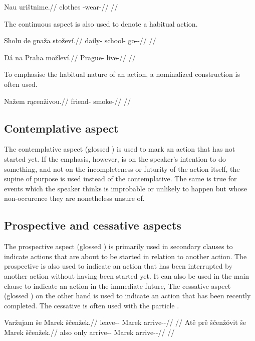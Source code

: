 \pex
\begingl
\gla Nau urištnime.//
\glb clothes \Refl{}-wear-//
\glft {} //
\endgl
\xe

The continuous aspect is also used to denote a habitual action.

\pex
\begingl
\gla Sholu de gnaža stoževí.//
\glb daily-\Ins{}  school-\Acc{} go-\Av{}-\Cont{}//
\glft {} //
\endgl
\xe

\pex
\begingl
\gla Dá na Praha možleví.//
\glb {} \Loc{} Prague-\Acc{} live-//
\glft {} //
\endgl
\xe

To emphasise the habitual nature of an action, a nominalized construction is
often used.

\pex
\begingl
\gla Nažem r\k{a}cenživou.//
\glb friend-\First{}\Sg{} smoke-//
\glft {} //
\endgl
\xe


\subsection{Contemplative aspect}

The contemplative aspect (glossed \Ctp{}) is used to mark an action that has not
started yet. If the emphasis, however, is on the speaker's intention to do
something, and not on the incompleteness or futurity of the action itself, the
supine of purpose is used instead of the contemplative. The same is true for
events which the speaker thinks is improbable or unlikely to happen but whose
non-occurence they are nonetheless unsure of.

\subsection{Prospective and cessative aspects}

The prospective aspect (glossed \Prosp{}) is primarily used in secondary clauses
to indicate actions that are about to be started in relation to another action.
The prospective is also used to indicate an action that has been interrupted by
another action without having been started yet. It can also be used in the main
clause to indicate an action in the immediate future, The cessative aspect
(glossed \Ces{}) on the other hand is used to indicate an action that has been
recently completed. The cessative is often used with the particle
.

\pex
\a\begingl
\gla Varžujam še Marek ščenžek.//
\glb leave-\Av{}-\Prosp{} \Com{} Marek arrive-\Av{}-\Pf{}//
\glft {} //
\endgl
\a\begingl
\gla Atě prě ščenžóvit še Marek ščenžek.//
\glb also only arrive-\Av{}-\Ces{} \Com{} Marek arrive-\Av{}-\Pf{}//
\glft {} //
\endgl
\xe

